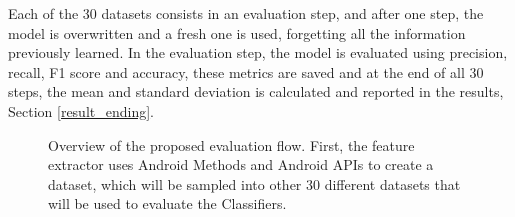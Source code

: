 Each of the 30 datasets consists in an evaluation step, and after one step, the model is overwritten and a fresh one is used, forgetting all the information previously learned. In the evaluation step, the model is evaluated using precision, recall, F1 score and accuracy, these metrics are saved and at the end of all 30 steps, the mean and standard deviation is calculated and reported in the results, Section \ref{result_ending}.


\begin{figure}[!h]
    \begin{center}
        
    \end{center}
    \caption{%
        Overview of the proposed evaluation flow. First, the feature extractor uses Android Methods and %
        Android APIs to create a dataset, which will be sampled into other 30 different datasets that will be used %
        to evaluate the Classifiers.%
    }\label{figure:flow}
\end{figure}

